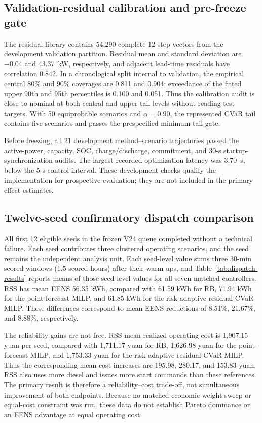 \subsection{Validation-residual calibration and pre-freeze gate}
\label{scenario-calibration-results}

The residual library contains 54,290 complete 12-step vectors from the
development validation partition. Residual mean and standard deviation are
$-0.04$ and 43.37~kW, respectively, and adjacent lead-time residuals have
correlation 0.842. In a chronological split internal to validation, the
empirical central 80\% and 90\% coverages are 0.811 and 0.904; exceedance of
the fitted upper 90th and 95th percentiles is 0.100 and 0.051. Thus the
calibration audit is close to nominal at both central and upper-tail levels
without reading test targets. With 50 equiprobable scenarios and
$\alpha=0.90$, the represented CVaR tail contains five scenarios and passes
the prespecified minimum-tail gate.

Before freezing, all 21 development method--scenario trajectories passed the
active-power, capacity, SOC, charge/discharge, commitment, and 30-s startup-
synchronization audits. The largest recorded optimization latency was 3.70~s,
below the 5-s control interval. These development checks qualify the
implementation for prospective evaluation; they are not included in the
primary effect estimates.

\subsection{Twelve-seed confirmatory dispatch comparison}
\label{frozen-dispatch-comparison}

All first 12 eligible seeds in the frozen V24 queue completed without a
technical failure. Each seed contributes three clustered operating scenarios,
and the seed remains the independent analysis unit. Each seed-level value sums
three 30-min scored windows (1.5 scored hours) after their warm-ups, and
Table~\ref{tab:dispatch-results} reports means of those seed-level values for
all seven matched controllers. RSS has mean EENS
56.35 kWh, compared with 61.59 kWh for RB, 71.94 kWh for the point-forecast
MILP, and 61.85 kWh for the risk-adaptive residual-CVaR MILP. These differences
correspond to mean EENS reductions of 8.51\%, 21.67\%, and 8.88\%, respectively.

The reliability gains are not free. RSS mean realized operating cost is
1,907.15 yuan per seed, compared with 1,711.17 yuan for RB, 1,626.98 yuan for
the point-forecast MILP, and 1,753.33 yuan for the risk-adaptive residual-CVaR
MILP. Thus the corresponding mean cost increases are 195.98, 280.17, and
153.83 yuan. RSS also uses more diesel and issues more start commands than
these references. The primary result is therefore a reliability--cost
trade-off, not simultaneous improvement of both endpoints. Because no matched
economic-weight sweep or equal-cost constraint was run, these data do not
establish Pareto dominance or an EENS advantage at equal operating cost.

